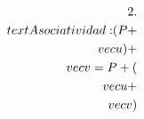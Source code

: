 \documentclass[preview]{standalone}
\begin{document}
\begin{align*}
\special{dvisvgm:raw <g id='unique000'>}2. \\text{ Asociatividad: } (P + \\vec{u}) + \\vec{v} = P + (\\vec{u} + \\vec{v})\special{dvisvgm:raw </g>}
\end{align*}
\end{document}
